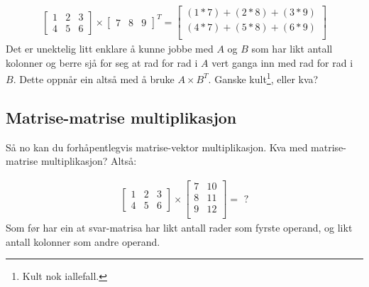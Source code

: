 \documentclass[12pt]{article}
\newcommand\x{\times}
\begin{document}
\begin{gather*}
\left[ 
\begin{array}{ccc}
1 & 2 & 3 \\
4 & 5 & 6
\end{array}
 \right] \x
\left[ 
\begin{array}{ccc}
7 & 8 & 9
\end{array}
\right]^T =
\left[ 
\begin{array}{ccc}
(1*7) + (2*8) + (3*9) \\
(4*7) + (5*8) + (6*9) \\
\end{array}
\right]
\end{gather*}
Det er unektelig litt enklare å kunne jobbe med $A$ og $B$
som har likt antall kolonner og berre sjå for seg at rad for rad i $A$ vert
ganga inn med rad for rad i $B$. Dette oppnår ein altså med å bruke $A \x B^T$.
Ganske kult\footnote{Kult nok iallefall.}, eller kva?

\subsection*{Matrise-matrise multiplikasjon}

Så no kan du forhåpentlegvis matrise-vektor multiplikasjon.
Kva med matrise-matrise multiplikasjon? Altså:

\begin{gather*}
\left[ 
\begin{array}{ccc}
1 & 2 & 3 \\
4 & 5 & 6
\end{array}
 \right] \x
\left[ 
\begin{array}{ccc}
7 & 10 \\
8 & 11 \\
9 & 12 \\
\end{array}\right]
= \text{ ?}
\end{gather*}
Som før har ein at svar-matrisa har likt antall rader som fyrste operand, 
og likt antall kolonner som andre operand.
\end{document}

